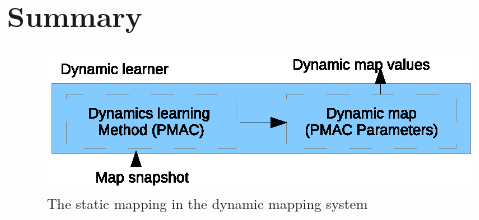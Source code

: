 \section{Summary}


\begin{figure}[htbp]
	\centering
	\includegraphics[scale=1]{chapters/mapping_of_dynamic_areas/figures/dynamic_detail.eps}
	\caption{The static mapping in the dynamic mapping system}
	\label{fig:dynamic_learner_detail}
\end{figure}